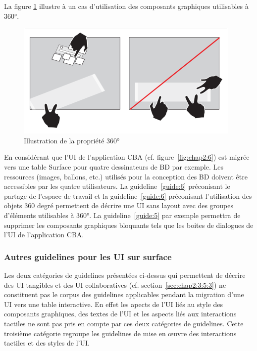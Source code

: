 La figure \ref{fig:chap2:13} illustre à un cas d'utilisation des composants graphiques utilisables à 360°. 
\begin{figure}[h]
\begin{center}
\includegraphics[angle=270,scale=.4]{chap2/img-13} 
\caption{Illustration de la propriété 360°}
\label{fig:chap2:13}
\end{center}
\end{figure}

En considérant que l'UI de l'application CBA (cf. figure~\ref{fig:chap2:6}) est migrée vers une table Surface pour quatre dessinateurs de BD par exemple. Les ressources (images, ballons, etc.) utilisés pour la conception des BD doivent être accessibles par les quatre utilisateurs. La guideline~\ref{guide:6} préconisant le partage de l'espace de travail et la guideline~\ref{guide:6} préconisant l'utilisation des objets 360 degré permettent de décrire une UI sans layout avec des groupes d'éléments utilisables à 360°. La guideline~\ref{guide:5} par exemple permettra de supprimer les composants graphiques bloquants tels que les boites de dialogues de l'UI de l'application CBA.

\subsubsection{Autres guidelines pour les UI sur surface}
\label{sec:chap2:3:5:4}
Les deux catégories de guidelines présentées ci-dessus qui permettent de décrire des UI tangibles et des UI collaboratives (cf. section~\ref{sec:chap2:3:5:3}) ne constituent pas le corpus des guidelines applicables pendant la migration d'une UI vers une table interactive. En effet les apects de l'UI liés au style des composants graphiques, des textes  de l'UI et les aspects liés aux interactions tactiles ne sont pas pris en compte par ces deux catégories de guidelines. 
Cette troisième catégorie regroupe les guidelines de mise en {\oe}uvre des interactions tactiles et des styles de l'UI.
